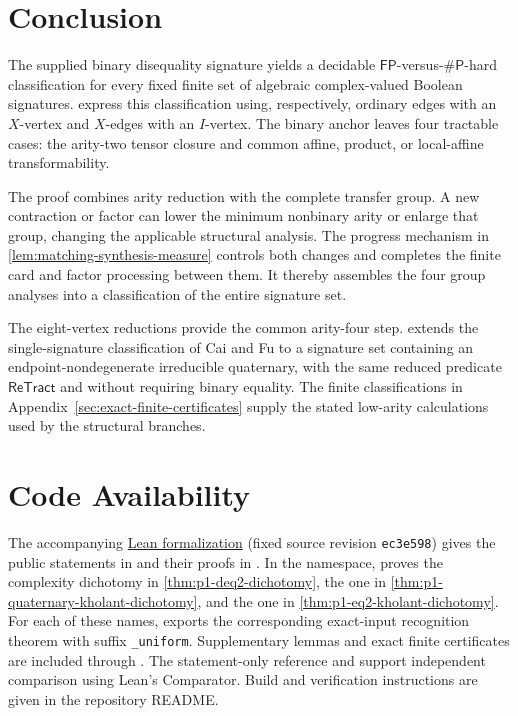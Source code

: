 \documentclass[11pt,letterpaper,onecolumn]{article}
\theoremstyle{plain}
\theoremstyle{definition}
\theoremstyle{remark}
\newcommand{\GitHubIcon}{\mbox{\faGithub}\nobreakspace}}{\newcommand{\GitHubIcon}{}}
\newcommand{\ReTract}{\mathsf{ReTract}}
\newcommand{\FP}{\mathsf{FP}}
\newcommand{\SharpP}{\#\mathsf P}
\begin{document}
\section{Conclusion}
\label{sec:p1-conclusion}

The supplied binary disequality signature yields a decidable
\(\FP\)-versus-\(\SharpP\)-hard classification for every fixed finite
set of algebraic complex-valued Boolean signatures.
 express this
classification using, respectively, ordinary edges with an \(X\)-vertex
and \(X\)-edges with an \(I\)-vertex.  The binary anchor leaves
four tractable cases: the arity-two tensor closure and common
affine, product, or local-affine transformability.

The proof combines arity reduction with the complete transfer group.
A new contraction or factor can lower the minimum nonbinary arity or
enlarge that group, changing the applicable structural analysis.
The progress mechanism in \cref{lem:matching-synthesis-measure} controls
both changes and completes the finite card and factor processing between
them. It thereby assembles the four group analyses into a classification
of the entire signature set.

The eight-vertex reductions provide the common arity-four step.
 extends the single-signature
classification of Cai and Fu
\cite[arXiv version~2, Theorem~3.1]{CaiFu2023}
to a signature set containing an endpoint-nondegenerate irreducible
quaternary, with the same reduced predicate \(\ReTract\) and without
requiring binary equality. The finite classifications in Appendix~\ref{sec:exact-finite-certificates}
supply the stated low-arity calculations used by the structural branches.

\section*{Code Availability}
The accompanying
\href{https://github.com/liuchliuch/holant-binary-disequality-lean/tree/ec3e598e380c57e1c4d1a3c73a4ad1b4f7eed711}%
{\textcolor{repositorylink}{\GitHubIcon Lean formalization}}
(fixed source revision \texttt{ec3e598}) gives the public statements in
 and their proofs in .
In the  namespace,  proves the
complexity dichotomy in \cref{thm:p1-deq2-dichotomy},
 the one in \cref{thm:p1-quaternary-kholant-dichotomy},
and  the one in \cref{thm:p1-eq2-kholant-dichotomy}.
For each of these names,  exports the
corresponding exact-input recognition theorem with suffix \texttt{\_uniform}.
Supplementary lemmas and exact finite
certificates are included through .
The statement-only reference  and
 support independent comparison using
Lean's Comparator.  Build and verification instructions are given in the
repository README.
\end{document}
